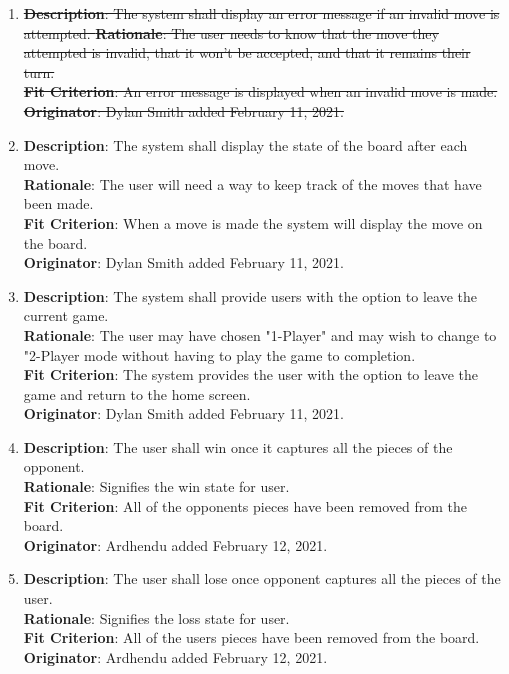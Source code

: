 \documentclass[12pt, titlepage]{article}
\begin{document}
\begin{enumerate}[{FR}1.]
    \item{\color{blue} \st{\textbf{Description}: The system shall display an error message if an invalid move is attempted.
    \textbf{Rationale}: The user needs to know that the move they attempted is invalid, that it won't be accepted, and that it remains their turn.\\
        \textbf{Fit Criterion}: An error message is displayed when an invalid move is made.\\
        \textbf{Originator}: Dylan Smith added February 11, 2021.} }\\
        
        
    \item\textbf{Description}: The system shall display the state of the board after each move.\\
        \textbf{Rationale}: The user will need a way to keep track of the moves that have been made.\\
        \textbf{Fit Criterion}: When a move is made the system will display the move on the board.\\
        \textbf{Originator}: Dylan Smith added February 11, 2021.
        
    \item\textbf{Description}: The system shall provide users with the option to leave the current game.\\
        \textbf{Rationale}: The user may have chosen "1-Player" and may wish to change to "2-Player mode without having to play the game to completion.\\
        \textbf{Fit Criterion}: The system provides the user with the option to leave the game and return to the home screen.\\
        \textbf{Originator}: Dylan Smith added February 11, 2021.
        
    \item\textbf{Description}: The user shall win once it captures all the pieces of the opponent.\\
        \textbf{Rationale}: Signifies the win state for user.\\
        \textbf{Fit Criterion}: All of the opponents pieces have been removed from the board.\\
        \textbf{Originator}: Ardhendu added February 12, 2021.
        
    \item\textbf{Description}: The user shall lose once opponent captures all the pieces of the user.\\
        \textbf{Rationale}: Signifies the loss state for user.\\
        \textbf{Fit Criterion}: All of the users pieces have been removed from the board.\\
        \textbf{Originator}: Ardhendu added February 12, 2021.
        

\end{enumerate}
\end{document}
